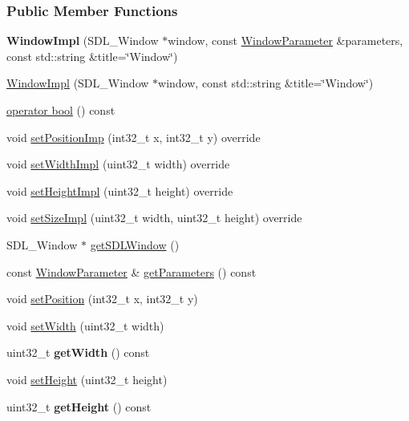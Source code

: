\subsubsection*{Public Member Functions}
\begin{DoxyCompactItemize}
\item 
{\bfseries Window\+Impl} (S\+D\+L\+\_\+\+Window $\ast$window, const \hyperlink{a00091}{Window\+Parameter} \&parameters, const std\+::string \&title=\char`\"{}Window\char`\"{})\hypertarget{a00085_a675149167b616ebec6059300908036be}{}\label{a00085_a675149167b616ebec6059300908036be}

\item 
\hyperlink{a00085_abe5d2ca094660b7bbb3253a2e59f0c40}{Window\+Impl} (S\+D\+L\+\_\+\+Window $\ast$window, const std\+::string \&title=\char`\"{}Window\char`\"{})
\item 
\hyperlink{a00085_a022aa2c636b4586fce459140d63dd4a3}{operator bool} () const 
\item 
void \hyperlink{a00085_a1e3bb0cf9a7774291fd326b52e446c50}{set\+Position\+Imp} (int32\+\_\+t x, int32\+\_\+t y) override
\item 
void \hyperlink{a00085_a4291d464432a5e432675147978427046}{set\+Width\+Impl} (uint32\+\_\+t width) override
\item 
void \hyperlink{a00085_aec8cd8820617c3c8bf03c0f14ca39c29}{set\+Height\+Impl} (uint32\+\_\+t height) override
\item 
void \hyperlink{a00085_ac197d9aeb0ab4d84d6b1aaaa3569df49}{set\+Size\+Impl} (uint32\+\_\+t width, uint32\+\_\+t height) override
\item 
S\+D\+L\+\_\+\+Window $\ast$ \hyperlink{a00085_a2ac40d78891bc1baa892ae81834c040d}{get\+S\+D\+L\+Window} ()
\item 
const \hyperlink{a00091}{Window\+Parameter} \& \hyperlink{a00082_afbb0f8b825f17fbf8f434c4ab9ae5f8d}{get\+Parameters} () const 
\item 
void \hyperlink{a00082_ad6874b68c5cd0b59ec75ac8ad15f2a3a}{set\+Position} (int32\+\_\+t x, int32\+\_\+t y)
\item 
void \hyperlink{a00082_a3435c3bf0e07492ec77f3977c9b5e355}{set\+Width} (uint32\+\_\+t width)
\item 
uint32\+\_\+t {\bfseries get\+Width} () const \hypertarget{a00082_a8f13b82e3aa16ac711b2efd5411964d0}{}\label{a00082_a8f13b82e3aa16ac711b2efd5411964d0}

\item 
void \hyperlink{a00082_a87b8b6f2c1a08327d4010e2b6aceb319}{set\+Height} (uint32\+\_\+t height)
\item 
uint32\+\_\+t {\bfseries get\+Height} () const \hypertarget{a00082_accdce871efc461fe3348d62f8087b73d}{}\label{a00082_accdce871efc461fe3348d62f8087b73d}


\end{DoxyCompactItemize}
